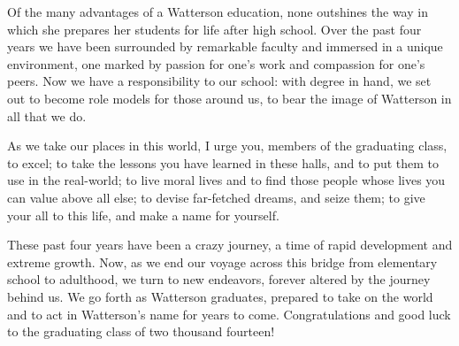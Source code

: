 \documentclass{report}
\begin{document}
Of the many advantages of a Watterson education, none outshines the way in
which she prepares her students for life after high school. Over the past four
years we have been surrounded by remarkable faculty and immersed in a unique
environment, one marked by passion for one's work and compassion for one's
peers. Now we have a responsibility to our school: with degree in hand, we set
out to become role models for those around us, to bear the image of Watterson
in all that we do.

As we take our places in this world, I urge you, members of the graduating
class, to excel; to take the lessons you have learned in these halls, and to
put them to use in the real-world; to live moral lives and to find those people
whose lives you can value above all else; to devise far-fetched dreams, and
seize them; to give your all to this life, and make a name for yourself.

These past four years have been a crazy journey, a time of rapid development
and extreme growth. Now, as we end our voyage across this bridge from
elementary school to adulthood, we turn to new endeavors, forever altered by
the journey behind us. We go forth as Watterson graduates, prepared to take on
the world and to act in Watterson's name for years to come. Congratulations and
good luck to the graduating class of two thousand fourteen!
\end{document}
